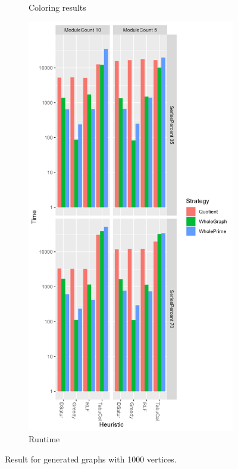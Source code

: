 \documentclass[a4paper]{article}
\begin{document}
\begin{figure}[p]
\begin{subfigure}{\resultbase}
      \caption{Coloring results}
      \label{fig:1000c}
    \end{subfigure}%
    \begin{subfigure}{\resultbase}
        \includegraphics[width=\columnwidth]{Tables/1000Time.png}
      \caption{Runtime}
      \label{fig:1000t}
    \end{subfigure}
\caption{Result for generated graphs with 1000 vertices. \facfigdesc }
\label{fig:1000}
\end{figure}
\end{document}
